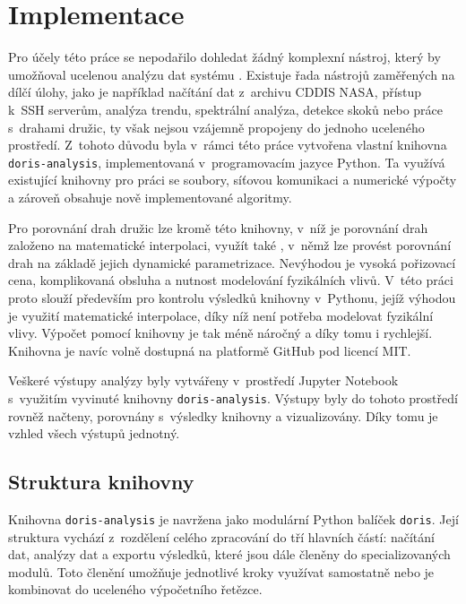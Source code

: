 \chapter{Implementace}
\label{5-implementace}

Pro účely této práce se nepodařilo dohledat žádný komplexní nástroj, který by umožňoval ucelenou analýzu dat systému . Existuje řada nástrojů zaměřených na dílčí úlohy, jako je například načítání dat z~archivu CDDIS NASA, přístup k~SSH serverům, analýza trendu, spektrální analýza, detekce skoků nebo práce s~drahami družic, ty však nejsou vzájemně propojeny do jednoho uceleného prostředí. Z~tohoto důvodu byla v~rámci této práce vytvořena vlastní knihovna \texttt{doris-analysis}, implementovaná v~programovacím jazyce Python. Ta využívá existující knihovny pro práci se soubory, síťovou komunikaci a numerické výpočty a zároveň obsahuje nově implementované algoritmy.

Pro porovnání drah družic lze kromě této knihovny, v~níž je porovnání drah založeno na matematické interpolaci, využít také , v~němž lze provést porovnání drah na základě jejich dynamické parametrizace. Nevýhodou  je vysoká pořizovací cena, komplikovaná obsluha a nutnost modelování fyzikálních vlivů. V~této práci proto  slouží především pro kontrolu výsledků knihovny v~Pythonu, jejíž výhodou je využití matematické interpolace, díky níž není potřeba modelovat fyzikální vlivy. Výpočet pomocí knihovny je tak méně náročný a díky tomu i rychlejší. Knihovna je navíc volně dostupná na platformě GitHub pod licencí MIT.

Veškeré výstupy analýzy byly vytvářeny v~prostředí Jupyter Notebook s~využitím vyvinuté knihovny \texttt{doris-analysis}. Výstupy  byly do tohoto prostředí rovněž načteny, porovnány 
s~výsledky knihovny a vizualizovány. Díky tomu je vzhled všech výstupů jednotný.

\section{Struktura knihovny}

Knihovna \texttt{doris-analysis} je navržena jako modulární Python balíček \texttt{doris}. Její struktura vychází z~rozdělení celého zpracování do tří hlavních částí: načítání dat, analýzy dat a exportu výsledků, které jsou dále členěny do specializovaných modulů. Toto členění umožňuje jednotlivé kroky využívat samostatně nebo je kombinovat do uceleného výpočetního řetězce.


